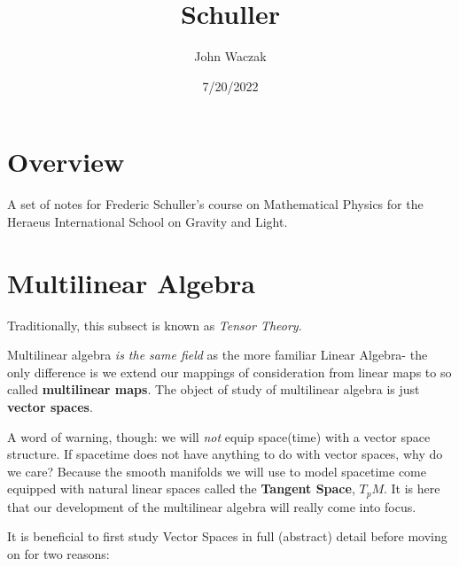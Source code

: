 \documentclass[
  letterpaper,
  DIV=11,
  numbers=noendperiod,
  oneside]{scrreprt}
\title{Schuller}
\author{John Waczak}
\date{7/20/2022}
\renewcommand*\contentsname{Table of contents}
\newcommand\contentsname{Table of contents}
\begin{document}
\maketitle
\ifdefined\Shaded\renewenvironment{Shaded}{\begin{tcolorbox}[boxrule=0pt, breakable, borderline west={3pt}{0pt}{shadecolor}, enhanced, sharp corners, frame hidden, interior hidden]}{\end{tcolorbox}}\fi

\renewcommand*\contentsname{Table of contents}
{
\hypersetup{linkcolor=}
\setcounter{tocdepth}{2}
\tableofcontents
}

\hypertarget{overview}{%
\chapter*{Overview}\label{overview}}

A set of notes for Frederic Schuller's course on Mathematical Physics
for the Heraeus International School on Gravity and Light.


\hypertarget{multilinear-algebra}{%
\chapter{Multilinear Algebra}\label{multilinear-algebra}}

Traditionally, this subsect is known as \emph{Tensor Theory}.

Multilinear algebra \emph{is the same field} as the more familiar Linear
Algebra- the only difference is we extend our mappings of consideration
from linear maps to so called \textbf{multilinear maps}. The object of
study of multilinear algebra is just \textbf{vector spaces}.

A word of warning, though: we will \emph{not} equip space(time) with a
vector space structure. If spacetime does not have anything to do with
vector spaces, why do we care? Because the smooth manifolds we will use
to model spacetime come equipped with natural linear spaces called the
\textbf{Tangent Space}, \(T_pM\). It is here that our development of the
multilinear algebra will really come into focus.

It is beneficial to first study Vector Spaces in full (abstract) detail
before moving on for two reasons:
\end{document}
